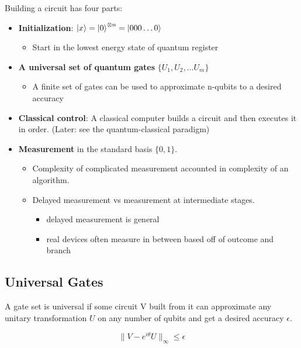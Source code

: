 \documentclass[11pt]{article}
\begin{document}
Building a circuit has four parts:

\begin{itemize}
	\item
	      \textbf{Initialization}: $\ket{x} = \ket{0}^{\otimes n} = \ket{000 \dots 0}$
	      \begin{itemize}
		      \item Start in the lowest energy state of quantum register
	      \end{itemize}

	\item
	      \textbf{A universal set of quantum gates} $\{U_1, U_2, \dots U_m\}$
	      \begin{itemize}
		      \item A finite set of gates can be used to approximate n-qubits to a desired accuracy
	      \end{itemize}

	\item
	      \textbf{Classical control}: A classical computer builds a circuit and then executes it in order. (Later: see the quantum-classical paradigm)

	\item
	      \textbf{Measurement} in the standard basis $\{0, 1\}$.
	      \begin{itemize}
		      \item Complexity of complicated measurement accounted in complexity of an algorithm.
		      \item Delayed measurement vs measurement at intermediate stages.
		            \begin{itemize}
			            \item delayed measurement is general
			            \item real devices often measure in between based off of outcome and branch
		            \end{itemize}
	      \end{itemize}
\end{itemize}

\subsection{Universal Gates}

A gate set is universal if some circuit V built from it can approximate any unitary transformation $U$ on any number of qubits and get a desired accuracy $\epsilon$.

\begin{equation*}
	\|V-e^{i\theta}U\|_{\infty} \le \epsilon
\end{equation*}
\end{document}
